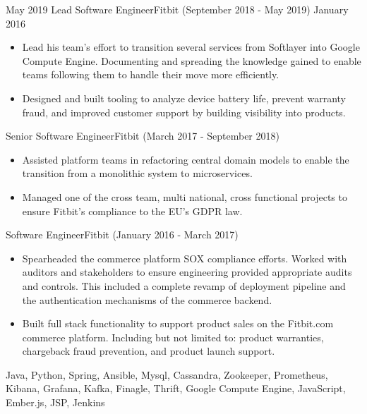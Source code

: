 \begin{experiences}
  \emptySeparator
  \experience
  {May 2019}  {Lead Software Engineer}{Fitbit {\footnotesize (September 2018 - May 2019)}}
  {January 2016}   {
                      \begin{itemize}
                        \item Lead his team’s effort to transition several services from Softlayer into Google Compute Engine. Documenting and spreading the knowledge gained to enable teams following them to handle their move more efficiently.
                        \item Designed and built tooling to analyze device battery life, prevent warranty fraud, and improved customer support by building visibility into products.
                      \end{itemize}
                  }
                  {}
  \experience
  {}  {Senior Software Engineer}{Fitbit {\footnotesize (March 2017 - September 2018)}}
  {}   {
                      \begin{itemize}
                        \item Assisted platform teams in refactoring central domain models to enable the transition from a monolithic system to microservices.
                        \item Managed one of the cross team, multi national, cross functional projects to ensure Fitbit’s compliance to the EU’s GDPR law.
                      \end{itemize}
                  }
                  {}
   \experience
  {}  {Software Engineer}{Fitbit {\footnotesize (January 2016 - March 2017)}}
  {}   {
                      \begin{itemize}
                        \item Spearheaded the commerce platform SOX compliance efforts. Worked with auditors and stakeholders to ensure engineering provided appropriate audits and controls. This included a complete revamp of deployment pipeline and the authentication mechanisms of the commerce backend.
                        \item Built full stack functionality to support product sales on the Fitbit.com commerce platform. Including but not limited to: product warranties, chargeback fraud prevention, and product launch support.
                      \end{itemize}
                  }
                  {Java, Python, Spring, Ansible, Mysql, Cassandra, Zookeeper, Prometheus, Kibana, Grafana, Kafka, Finagle, Thrift, Google Compute Engine, JavaScript, Ember.js, JSP, Jenkins}

\end{experiences}
